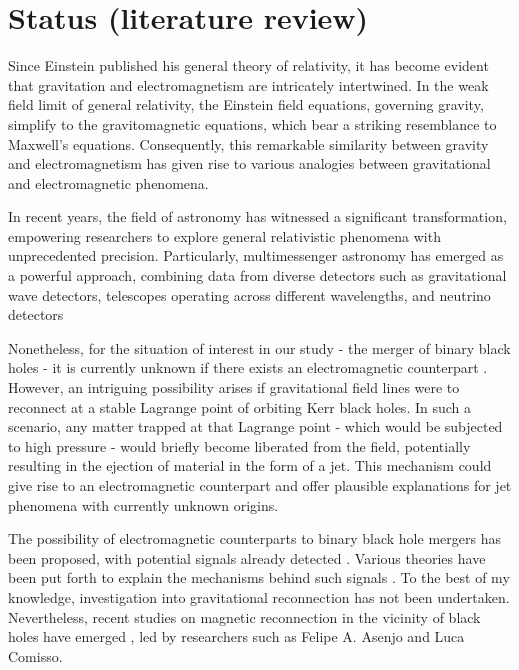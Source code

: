 \section{Status (literature review)}


Since Einstein published his general theory of relativity, it has become evident that gravitation and electromagnetism are intricately intertwined. In the weak field limit of general relativity, the Einstein field equations, governing gravity, simplify to the gravitomagnetic equations, which bear a striking resemblance to Maxwell's equations. Consequently, this remarkable similarity between gravity and electromagnetism has given rise to various analogies between gravitational and electromagnetic phenomena. 

In recent years, the field of astronomy has witnessed a significant transformation, empowering researchers to explore general relativistic phenomena with unprecedented precision. Particularly, multimessenger astronomy has emerged as a powerful approach, combining data from diverse detectors such as gravitational wave detectors, telescopes operating across different wavelengths, and neutrino detectors 

Nonetheless, for the situation of interest in our study - the merger of binary black holes - it is currently unknown if there exists an electromagnetic counterpart \cite{perna2019limits}. However, an intriguing possibility arises if gravitational field lines were to reconnect at a stable Lagrange point of orbiting Kerr black holes. In such a scenario, any matter trapped at that Lagrange point - which would be subjected to high pressure - would briefly become liberated from the field, potentially resulting in the ejection of material in the form of a jet. This mechanism could give rise to an electromagnetic counterpart and offer plausible explanations for jet phenomena with currently unknown origins.

The possibility of electromagnetic counterparts to binary black hole mergers has been proposed, with potential signals already detected \cite{graham2020candidate}. Various theories have been put forth to explain the mechanisms behind such signals \cite{kelly2017prompt}. To the best of my knowledge, investigation into gravitational reconnection has not been undertaken. Nevertheless, recent studies on magnetic reconnection in the vicinity of black holes have emerged \cite{AsenjoFelipeA2017RMRi,comisso2021magnetic}, led by researchers such as Felipe A. Asenjo and Luca Comisso.


